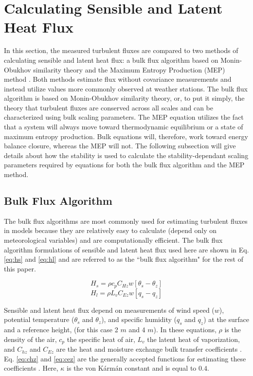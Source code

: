 \section{Calculating Sensible and Latent Heat Flux}
In this section, the measured turbulent fluxes are compared to two methods of calculating sensible and latent heat flux: a bulk flux algorithm based on Monin-Obukhov similarity theory \citep{foken:2008} and the Maximum Entropy Production (MEP) method \citep{zhang:2021, wang:2014, wang:2009}. Both methods estimate flux without covariance measurements and instead utilize values more commonly observed at weather stations. The bulk flux algorithm is based on Monin-Obukhov similarity theory, or, to put it simply, the theory that turbulent fluxes are conserved across all scales and can be characterized using bulk scaling parameters. The MEP equation utilizes the fact that a system will always move toward thermodynamic equilibrium or a state of maximum entropy production. Bulk equations will, therefore, work toward energy balance closure, whereas the MEP will not. The following subsection will give details about how the stability is used to calculate the stability-dependant scaling parameters required by equations for both the bulk flux algorithm and the MEP method.  

\subsection{Bulk Flux Algorithm}
The bulk flux algorithms are most commonly used for estimating turbulent fluxes \cite{reeves:2021} in models because they are relatively easy to calculate (depend only on meteorological variables) and are computationally efficient. The bulk flux algorithm formulations of sensible and latent heat flux used here are shown in Eq. \ref{eq:hs} and \ref{eq:hl} and are referred to as the ``bulk flux algorithm" for the rest of this paper.

\begin{equation}\label{eq:hs}
H_{s} = \rho c_{p} C_{Hz} w [\theta_{s} - \theta_{z}]
\end{equation}
\begin{equation}\label{eq:hl}
H_{l} = \rho L_{v} C_{Ez} w [q_{s} - q_{z}] 
\end{equation}

Sensible and latent heat flux depend on measurements of wind speed ($w$), potential temperature ($\theta_{s}$ and $\theta_{z}$), and specific humidity ($q_{s}$ and $q_{z}$) at the surface and a reference height, (for this case 2 $m$ and 4 $m$). In these equations, $\rho$ is the density of the air, $c_{p}$ the specific heat of air, $L_{v}$ the latent heat of vaporization, and $C_{hz}$ and $C_{Ez}$ are the heat and moisture exchange bulk transfer coefficients \citep{foken:2008, andreas:311}. Eq. \ref{eq:chz} and \ref{eq:cez} are the generally accepted functions for estimating these coefficients \citep{foken:2008}. Here, $\kappa$ is the von K\'{a}rm\'{a}n constant and is equal to $0.4$.

